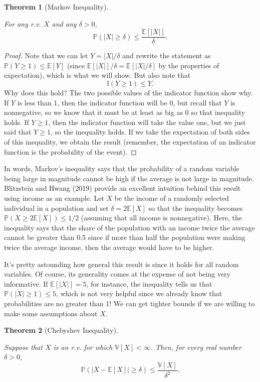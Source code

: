 \documentclass[
  13pt,
  letterpaper,
  DIV=11,
  numbers=noendperiod]{scrreprt}
\newcommand{\E}{\mathbb{E}}
\newcommand{\V}{\mathbb{V}}
\renewcommand{\P}{\mathbb{P}}
\theoremstyle{plain}
\newtheorem{theorem}{Theorem}[chapter]
\theoremstyle{plain}
\theoremstyle{definition}
\theoremstyle{definition}
\theoremstyle{remark}
\begin{document}
\begin{theorem}[Markov
Inequality]\protect\hypertarget{thm-markov}{}\label{thm-markov}

For any r.v. \(X\) and any \(\delta >0\), \[
\P(|X| \geq \delta) \leq \frac{\E[|X|]}{\delta}.
\]

\end{theorem}

\begin{proof}
Note that we can let \(Y = |X|/\delta\) and rewrite the statement as
\(\P(Y \geq 1) \leq \E[Y]\) (since \(\E[|X|]/\delta = \E[|X|/\delta]\)
by the properties of expectation), which is what we will show. But also
note that \[
\mathbb{I}(Y \geq 1) \leq Y.
\] Why does this hold? The two possible values of the indicator function
show why. If \(Y\) is less than 1, then the indicator function will be
0, but recall that \(Y\) is nonnegative, so we know that it must be at
least as big as 0 so that inequality holds. If \(Y \geq 1\), then the
indicator function will take the value one, but we just said that
\(Y \geq 1\), so the inequality holds. If we take the expectation of
both sides of this inequality, we obtain the result (remember, the
expectation of an indicator function is the probability of the event).
\end{proof}

In words, Markov's inequality says that the probability of a random
variable being large in magnitude cannot be high if the average is not
large in magnitude. Blitzstein and Hwang (2019) provide an excellent
intuition behind this result using income as an example. Let \(X\) be
the income of a randomly selected individual in a population and set
\(\delta = 2\E[X]\) so that the inequality becomes
\(\P(X \geq 2\E[X]) \leq 1/2\) (assuming that all income is
nonnegative). Here, the inequality says that the share of the population
with an income twice the average cannot be greater than 0.5 since if
more than half the population were making twice the average income, then
the average would have to be higher.

It's pretty astounding how general this result is since it holds for all
random variables. Of course, its generality comes at the expense of not
being very informative. If \(\E[|X|] = 5\), for instance, the inequality
tells us that \(\P(|X| \geq 1) \leq 5\), which is not very helpful since
we already know that probabilities are no greater than 1! We can get
tighter bounds if we are willing to make some assumptions about \(X\).

\begin{theorem}[Chebyshev
Inequality]\protect\hypertarget{thm-chebyshev}{}\label{thm-chebyshev}

Suppose that \(X\) is an r.v. for which \(\V[X] < \infty\). Then, for
every real number \(\delta > 0\), \[
\P(|X-\E[X]| \geq \delta) \leq \frac{\V[X]}{\delta^2}.
\]

\end{theorem}
\end{document}
